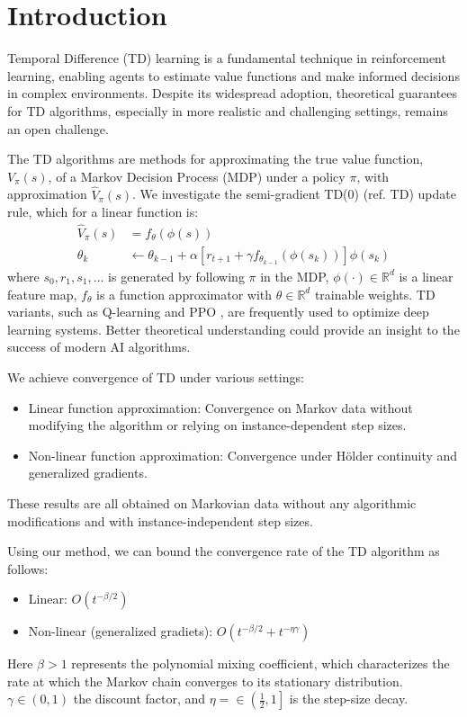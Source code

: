 \section{Introduction}
Temporal Difference (TD) learning is a fundamental technique in reinforcement learning, enabling agents to estimate value functions and make informed decisions in complex environments. Despite its widespread adoption, theoretical guarantees for TD algorithms, especially in more realistic and challenging settings, remains an open challenge.

The TD algorithms \cite{sutton1988learning,sutton2018reinforcement} are methods for approximating the true value function, \(V_{\pi}(s)\), of a Markov Decision Process (MDP) under a policy $\pi$, with approximation $\hat{V}_{\pi}(s)$.
We investigate the semi-gradient TD(0) (ref. TD) update rule, which for a linear function is:
\begin{align*}
\hat{V}_{\pi}(s) &=  f_\theta(\phi(s))\\
    \theta_k &\gets \theta_{k-1} + \alpha \left[ r_{t+1} + \gamma f_{\theta_{k-1}}(\phi(s_k))\right]\phi(s_k)
\end{align*}
where \(s_0, r_1, s_1, \dots \) is generated by following $\pi$ in the MDP, \(\phi(\cdot) \in \mathbb{R}^d\) is a linear feature map, $f_\theta$ is a function approximator with $\theta\in\mathbb{R}^d$ trainable weights.
TD variants, such as Q-learning \cite{watkins1992q} and PPO \cite{schulman2017proximal}, are frequently used to optimize deep learning systems.
Better theoretical understanding could provide an insight to the success of modern AI algorithms.

We achieve convergence of TD under various settings:
\begin{itemize}
    \item[\ding{72}] Linear function approximation: Convergence on Markov data without modifying the algorithm or relying on instance-dependent step sizes. 
    \item[\ding{72}] Non-linear function approximation: Convergence under Hölder continuity and generalized gradients.
\end{itemize} 
These results are all obtained on Markovian data without any algorithmic modifications and with instance-independent step sizes.

Using our method, we can bound the convergence rate of the TD algorithm as follows:
\begin{itemize}
    \item Linear: \(O(t^{-\beta/2})\)
    \item Non-linear (generalized gradiets): \(O(t^{-\beta/2} + t^{-\eta\gamma})\)
\end{itemize} 
Here $\beta>1$ represents the polynomial mixing coefficient, which characterizes the rate at which the Markov chain converges to its stationary distribution.
$\gamma\in(0,1)$ the discount factor, and $\eta=\in \left(\tfrac{1}{2},1\right]$ is the step-size decay.

